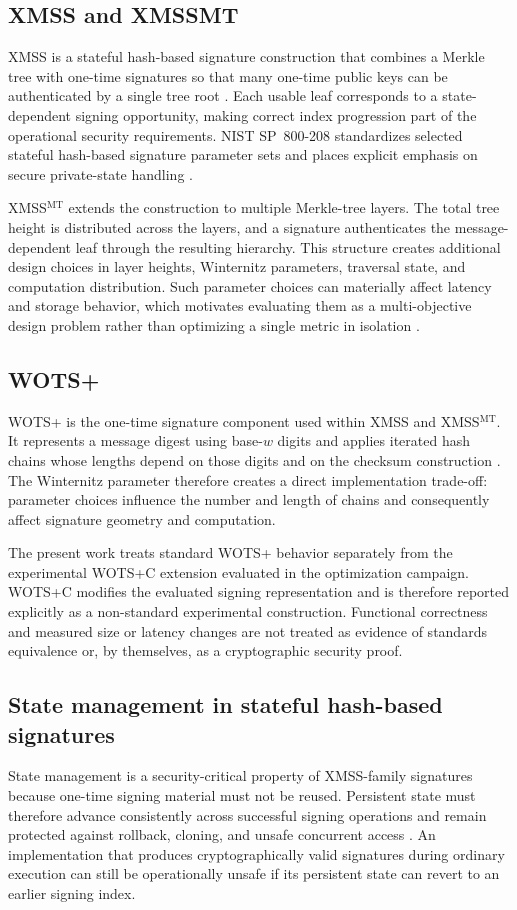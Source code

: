 \documentclass[pdflatex,sn-mathphys-num]{sn-jnl}
\begin{document}
\subsection{XMSS and XMSSMT}
XMSS is a stateful hash-based signature construction that combines
a Merkle tree with one-time signatures so that many one-time public
keys can be authenticated by a single tree root
\cite{Buchmann2011XMSS,RFC8391}. Each usable leaf corresponds to a
state-dependent signing opportunity, making correct index progression
part of the operational security requirements. NIST SP~800-208
standardizes selected stateful hash-based signature parameter sets and
places explicit emphasis on secure private-state handling
\cite{NIST800208}.

XMSS$^{\mathrm{MT}}$ extends the construction to multiple Merkle-tree
layers. The total tree height is distributed across the layers, and a
signature authenticates the message-dependent leaf through the
resulting hierarchy. This structure creates additional design choices
in layer heights, Winternitz parameters, traversal state, and
computation distribution. Such parameter choices can materially affect
latency and storage behavior, which motivates evaluating them as a
multi-objective design problem rather than optimizing a single metric
in isolation \cite{OptimalParametersXMSSMT}.

\subsection{WOTS+}
WOTS+ is the one-time signature component used within XMSS and
XMSS$^{\mathrm{MT}}$. It represents a message digest using base-$w$
digits and applies iterated hash chains whose lengths depend on those
digits and on the checksum construction
\cite{Huelsing2013WOTSPlus,RFC8391}. The Winternitz parameter therefore
creates a direct implementation trade-off: parameter choices influence
the number and length of chains and consequently affect signature
geometry and computation.

The present work treats standard WOTS+ behavior separately from the
experimental WOTS+C extension evaluated in the optimization campaign.
WOTS+C modifies the evaluated signing representation and is therefore
reported explicitly as a non-standard experimental construction.
Functional correctness and measured size or latency changes are not
treated as evidence of standards equivalence or, by themselves, as a
cryptographic security proof.

\subsection{State management in stateful hash-based signatures}
State management is a security-critical property of XMSS-family
signatures because one-time signing material must not be reused.
Persistent state must therefore advance consistently across successful
signing operations and remain protected against rollback, cloning, and
unsafe concurrent access \cite{McGrew2016StateManagement,NIST800208}.
An implementation that produces cryptographically valid signatures
during ordinary execution can still be operationally unsafe if its
persistent state can revert to an earlier signing index.
\end{document}
